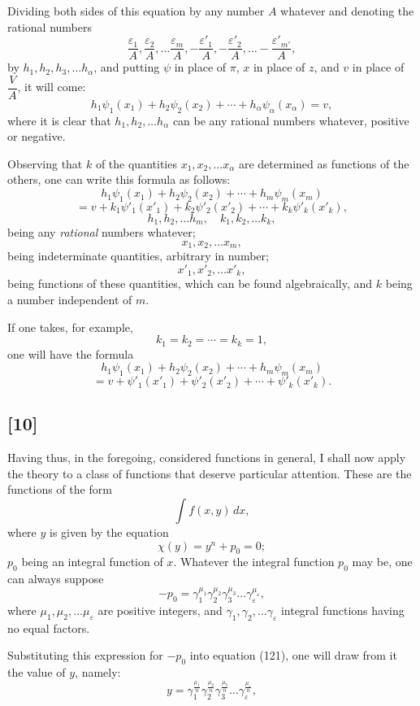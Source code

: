 \documentclass{article}
\begin{document}
Dividing both sides of this equation by any number $A$ whatever and denoting the rational numbers
\[ \frac{\varepsilon_1}{A}, \frac{\varepsilon_2}{A}, \ldots \frac{\varepsilon_m}{A}, -\frac{\varepsilon'_1}{A}, -\frac{\varepsilon'_2}{A}, \ldots -\frac{\varepsilon'_{m'}}{A}, \]
by $h_1, h_2, h_3, \ldots h_\alpha$, and putting $\psi$ in place of $\pi$, $x$ in place of $z$, and $v$ in place of $\dfrac{V}{A}$, it will come:
\[ h_1\psi_1(x_1)+h_2\psi_2(x_2)+\cdots+h_\alpha\psi_\alpha(x_\alpha) = v, \tag{117} \]
where it is clear that $h_1, h_2, \ldots h_\alpha$ can be any rational numbers whatever, positive or negative.

Observing that $k$ of the quantities $x_1, x_2, \ldots x_\alpha$ are determined as functions of the others, one can write this formula as follows:
\[ h_1\psi_1(x_1)+h_2\psi_2(x_2)+\cdots+h_m\psi_m(x_m) \]
\[ = v+k_1\psi'_1(x'_1)+k_2\psi'_2(x'_2)+\cdots+k_k\psi'_k(x'_k), \tag{118} \]
\[ h_1, h_2, \ldots h_m, \quad k_1, k_2, \ldots k_k, \]
being any \emph{rational} numbers whatever;
\[ x_1, x_2, \ldots x_m, \]
being indeterminate quantities, arbitrary in number;
\[ x'_1, x'_2, \ldots x'_k, \]
being functions of these quantities, which can be found algebraically, and $k$ being a number independent of $m$.

If one takes, for example,
\[ k_1 = k_2 = \cdots = k_k = 1, \]
one will have the formula
\[ h_1\psi_1(x_1)+h_2\psi_2(x_2)+\cdots+h_m\psi_m(x_m) \]
\[ = v+\psi'_1(x'_1)+\psi'_2(x'_2)+\cdots+\psi'_k(x'_k). \tag{119} \]

\subsection*{[10]}

Having thus, in the foregoing, considered functions in general, I shall now apply the theory to a class of functions that deserve particular attention. These are the functions of the form
\[ \int f(x, y)\,dx, \tag{120} \]
where $y$ is given by the equation
\[ \chi(y) = y^{n} + p_0 = 0; \tag{121} \]
$p_0$ being an integral function of $x$.
Whatever the integral function $p_0$ may be, one can always suppose
\[ -p_0 = \gamma_1^{\mu_1}\gamma_2^{\mu_2}\gamma_3^{\mu_3} \ldots \gamma_\varepsilon^{\mu_\varepsilon}, \tag{122} \]
where $\mu_1, \mu_2, \ldots \mu_\varepsilon$ are positive integers, and $\gamma_1, \gamma_2, \ldots \gamma_\varepsilon$ integral functions having no equal factors.

Substituting this expression for $-p_0$ into equation (121), one will draw from it the value of $y$, namely:
\[ y = \gamma_1^{\frac{\mu_1}{n}}\gamma_2^{\frac{\mu_2}{n}}\gamma_3^{\frac{\mu_3}{n}} \ldots \gamma_\varepsilon^{\frac{\mu_\varepsilon}{n}}, \tag{123} \]
\end{document}
